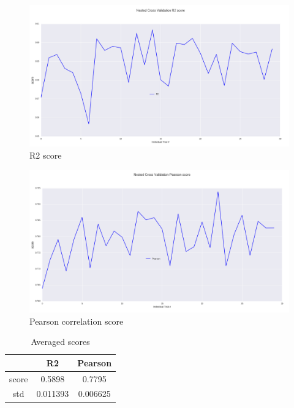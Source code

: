 \documentclass[10pt, a4paper]{article}
\begin{document}
\begin{figure}[h!]
\begin{center}
	\centering
	\includegraphics[scale=0.36]{R2.png}
	\caption{R2 score}
\end{center}
\end{figure}


\begin{figure}[h!]
\begin{center}
	\centering
	\includegraphics[scale=0.36]{Pearson.png}
	\caption{Pearson correlation score}
\end{center}
\end{figure}

\begin{table}
\caption{Averaged scores}
\label{tab:narrow-table}
\begin{center}
\begin{tabular}{ccc}
\toprule
& R2 & Pearson\\
\midrule
score & 0.5898 & 0.7795 \\
std & 0.011393 & 0.006625 \\
\bottomrule
\end{tabular}
\end{center}
\end{table}
\end{document}
